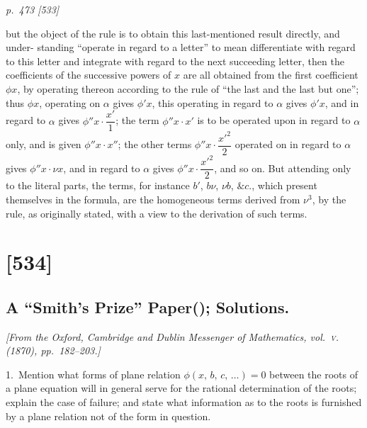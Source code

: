\documentclass[11pt,a4paper]{book}
\begin{document}
\clearpage

\bigskip
\textit{p.~473 [533]}
\smallskip

\noindent
but the object of the rule is to obtain this last-mentioned result directly, and under-
standing ``operate in regard to a letter'' to mean differentiate with regard to this
letter and integrate with regard to the next succeeding letter, then the coefficients
of the successive powers of $x$ are all obtained from the first coefficient $\phi x$, by operating
thereon according to the rule of ``the last and the last but one''; thus $\phi x$, operating
on $\alpha$ gives $\phi'x$, this operating in regard to $\alpha$ gives $\phi'x$, and in regard to $\alpha$ gives
$\phi''x\cdot\dfrac{x'}{1}$; the term $\phi''x \cdot x'$ is to be operated upon in regard to $\alpha$ only, and is given
$\phi''x\cdot x''$; the other terms $\phi''x\cdot\dfrac{x'^2}{2}$ operated on in regard to $\alpha$ gives $\phi''x\cdot \nu x$, and in regard
to $\alpha$ gives $\phi''x\cdot\dfrac{x'^2}{2}$, and so on. But attending only to the literal parts, the terms,
for instance $b'$, $b\nu$, $\nu b$, $\&c.$, which present themselves in the formula, are the homogeneous
terms derived from $\nu^3$, by the rule, as originally stated, with a view to the derivation
of such terms.

\clearpage

\section{[534]}
\subsection{A ``Smith's Prize'' Paper(\dag); Solutions.}

\begin{center}
\textit{[From the Oxford, Cambridge and Dublin Messenger of Mathematics, vol.~\textsc{v}. (1870), pp.~182--203.]}
\end{center}

\noindent\textsc{1.}\, Mention what forms of plane relation $\phi(x,\,b,\,c,\,\ldots)=0$ between the roots of a
plane equation will in general serve for the rational determination of the roots; explain
the case of failure; and state what information as to the roots is furnished by a plane
relation not of the form in question.
\end{document}
